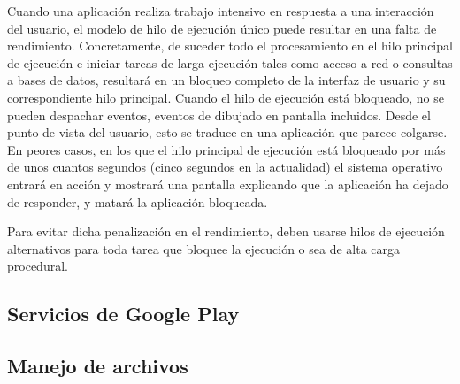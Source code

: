 Cuando una aplicación realiza trabajo intensivo en respuesta a una interacción del usuario, el modelo de hilo de ejecución único puede resultar en una falta de rendimiento. Concretamente, de suceder todo el procesamiento en el hilo principal de ejecución e iniciar tareas de larga ejecución tales como acceso a red o consultas a bases de datos, resultará en un bloqueo completo de la interfaz de usuario y su correspondiente hilo principal. Cuando el hilo de ejecución está bloqueado, no se pueden despachar eventos, eventos de dibujado en pantalla incluidos. Desde el punto de vista del usuario, esto se traduce en una aplicación que parece colgarse. En peores casos, en los que el hilo principal de ejecución está bloqueado por más de unos cuantos segundos (cinco segundos en la actualidad) el sistema operativo entrará en acción y mostrará una pantalla explicando que la aplicación ha dejado de responder, y matará la aplicación bloqueada. 

 Para evitar dicha penalización en el rendimiento, deben usarse hilos de ejecución alternativos para toda tarea que bloquee la ejecución o sea de alta carga procedural.

\subsection{Servicios de Google Play}

\subsection{Manejo de archivos}

\chapterend{}